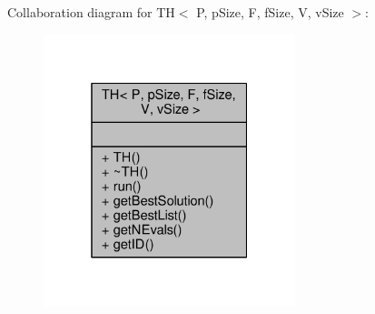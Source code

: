 Collaboration diagram for TH$<$ P, p\+Size, F, f\+Size, V, v\+Size $>$\+:\nopagebreak
\begin{figure}[H]
\begin{center}
\leavevmode
\includegraphics[width=208pt]{classTH__coll__graph}
\end{center}
\end{figure}
